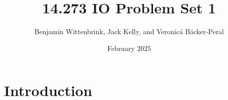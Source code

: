 \documentclass{article}
\title{14.273 IO Problem Set 1}
\author{Benjamin Wittenbrink, Jack Kelly, and Veronicá Bäcker-Peral}
\date{February 2025}
\begin{document}
\maketitle

\section{Introduction}
\end{document}
